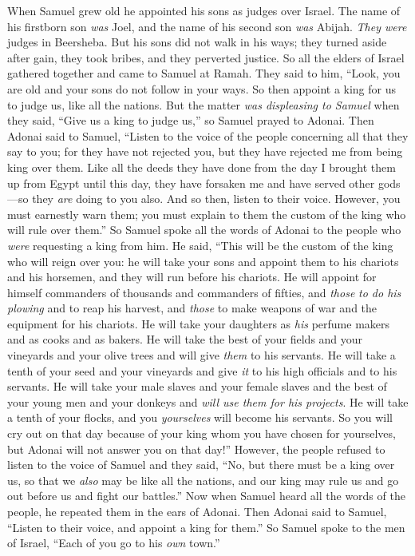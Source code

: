 \begin{biblechapter} %
 When Samuel grew old he appointed his sons as judges over Israel.
\verse The name of his firstborn son \textit{was} Joel, and the name of his second son \textit{was} Abijah. \textit{They were} judges in Beersheba.
\verse But his sons did not walk in his ways; they turned aside after gain, they took bribes, and they perverted justice.
\verse So all the elders of Israel gathered together and came to Samuel at Ramah.
\verse They said to him, “Look, you are old and your sons do not follow in your ways. So then appoint a king for us to judge us, like all the nations.
\verse But the matter \textit{was displeasing to Samuel} when they said, “Give us a king to judge us,” so Samuel prayed to Adonai.
\verse Then Adonai said to Samuel, “Listen to the voice of the people concerning all that they say to you; for they have not rejected you, but they have rejected me from being king over them.
\verse Like all the deeds they have done from the day I brought them up from Egypt until this day, they have forsaken me and have served other gods—so they \textit{are} doing to you also.
\verse And so then, listen to their voice. However, you must earnestly warn them; you must explain to them the custom of the king who will rule over them.”
\verse So Samuel spoke all the words of Adonai to the people who \textit{were} requesting a king from him.
\verse He said, “This will be the custom of the king who will reign over you: he will take your sons and appoint them to his chariots and his horsemen, and they will run before his chariots.
\verse He will appoint for himself commanders of thousands and commanders of fifties, and \textit{those} \textit{to do his plowing} and to reap his harvest, and \textit{those} to make weapons of war and the equipment for his chariots.
\verse He will take your daughters as \textit{his} perfume makers and as cooks and as bakers.
\verse He will take the best of your fields and your vineyards and your olive trees and will give \textit{them} to his servants.
\verse He will take a tenth of your seed and your vineyards and give \textit{it} to his high officials and to his servants.
\verse He will take your male slaves and your female slaves and the best of your young men and your donkeys and \textit{will use them for his projects}.
\verse He will take a tenth of your flocks, and you \textit{yourselves} will become his servants.
\verse So you will cry out on that day because of your king whom you have chosen for yourselves, but Adonai will not answer you on that day!”
\verse However, the people refused to listen to the voice of Samuel and they said, “No, but there must be a king over us,
\verse so that we \textit{also} may be like all the nations, and our king may rule us and go out before us and fight our battles.”
\verse Now when Samuel heard all the words of the people, he repeated them in the ears of Adonai.
\verse Then Adonai said to Samuel, “Listen to their voice, and appoint a king for them.” So Samuel spoke to the men of Israel, “Each of you go to his \textit{own} town.”
\end{biblechapter}

